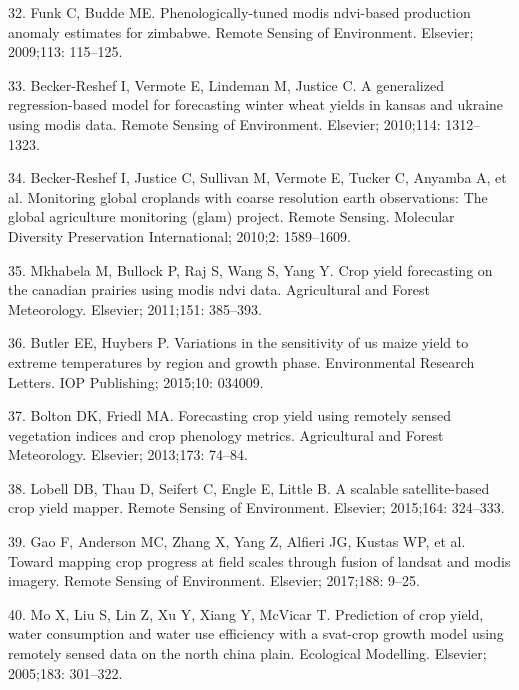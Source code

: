 \documentclass[10pt,letterpaper]{article}
\begin{document}
\hypertarget{ref-funk2009phenologically}{}
32. Funk C, Budde ME. Phenologically-tuned modis ndvi-based production
anomaly estimates for zimbabwe. Remote Sensing of Environment. Elsevier;
2009;113: 115--125.

\hypertarget{ref-becker2010generalized}{}
33. Becker-Reshef I, Vermote E, Lindeman M, Justice C. A generalized
regression-based model for forecasting winter wheat yields in kansas and
ukraine using modis data. Remote Sensing of Environment. Elsevier;
2010;114: 1312--1323.

\hypertarget{ref-becker2010monitoring}{}
34. Becker-Reshef I, Justice C, Sullivan M, Vermote E, Tucker C, Anyamba
A, et al. Monitoring global croplands with coarse resolution earth
observations: The global agriculture monitoring (glam) project. Remote
Sensing. Molecular Diversity Preservation International; 2010;2:
1589--1609.

\hypertarget{ref-mkhabela2011crop}{}
35. Mkhabela M, Bullock P, Raj S, Wang S, Yang Y. Crop yield forecasting
on the canadian prairies using modis ndvi data. Agricultural and Forest
Meteorology. Elsevier; 2011;151: 385--393.

\hypertarget{ref-butler2015variations}{}
36. Butler EE, Huybers P. Variations in the sensitivity of us maize
yield to extreme temperatures by region and growth phase. Environmental
Research Letters. IOP Publishing; 2015;10: 034009.

\hypertarget{ref-bolton2013forecasting}{}
37. Bolton DK, Friedl MA. Forecasting crop yield using remotely sensed
vegetation indices and crop phenology metrics. Agricultural and Forest
Meteorology. Elsevier; 2013;173: 74--84.

\hypertarget{ref-lobell2015scalable}{}
38. Lobell DB, Thau D, Seifert C, Engle E, Little B. A scalable
satellite-based crop yield mapper. Remote Sensing of Environment.
Elsevier; 2015;164: 324--333.

\hypertarget{ref-gao2017toward}{}
39. Gao F, Anderson MC, Zhang X, Yang Z, Alfieri JG, Kustas WP, et al.
Toward mapping crop progress at field scales through fusion of landsat
and modis imagery. Remote Sensing of Environment. Elsevier; 2017;188:
9--25.

\hypertarget{ref-mo2005prediction}{}
40. Mo X, Liu S, Lin Z, Xu Y, Xiang Y, McVicar T. Prediction of crop
yield, water consumption and water use efficiency with a svat-crop
growth model using remotely sensed data on the north china plain.
Ecological Modelling. Elsevier; 2005;183: 301--322.
\end{document}
